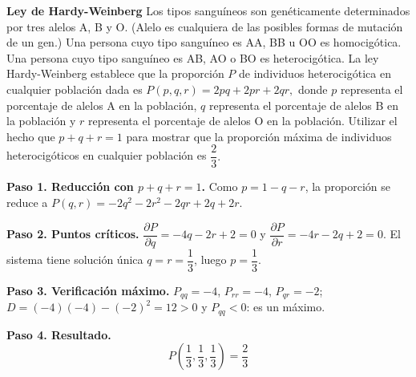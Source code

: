 \begin{prob}
\textbf{Ley de Hardy-Weinberg} Los tipos sanguíneos son genéticamente determinados por tres alelos A, B y O. (Alelo es cualquiera de las posibles formas de mutación de un gen.) Una persona cuyo tipo sanguíneo es AA, BB u OO es homocigótica. Una persona cuyo tipo sanguíneo es AB, AO o BO es heterocigótica. La ley Hardy-Weinberg establece que la proporción $P$ de individuos heterocigótica en cualquier población dada es $P(p,q,r)=2pq+2pr+2qr,$  donde $p$ representa el porcentaje de alelos A en la población, $q$ representa el porcentaje de alelos B en la población y $r$ representa el porcentaje de alelos O en la población. Utilizar el hecho que $p+q+r=1$ para mostrar que la proporción máxima de individuos heterocigóticos en cualquier población es $\dfrac{2}{3}.$
\begin{myproof}
\textbf{Paso 1. Reducción con $p+q+r=1$.}
Como $p=1-q-r$, la proporción se reduce a $P(q,r)=-2q^2-2r^2-2qr+2q+2r.$

\textbf{Paso 2. Puntos críticos.}
$\dfrac{\partial P}{\partial q}=-4q-2r+2=0$ y $\dfrac{\partial P}{\partial r}=-4r-2q+2=0$. El sistema tiene solución única $q=r=\dfrac{1}{3}$, luego $p=\dfrac{1}{3}$.

\textbf{Paso 3. Verificación máximo.}
$P_{qq}=-4$, $P_{rr}=-4$, $P_{qr}=-2$; $D=(-4)(-4)-(-2)^2=12>0$ y $P_{qq}<0$: es un máximo.

\textbf{Paso 4. Resultado.}
\[
\boxed{P\!\left(\dfrac{1}{3},\dfrac{1}{3},\dfrac{1}{3}\right)=\dfrac{2}{3}}
\]
\end{myproof}
\end{prob}

